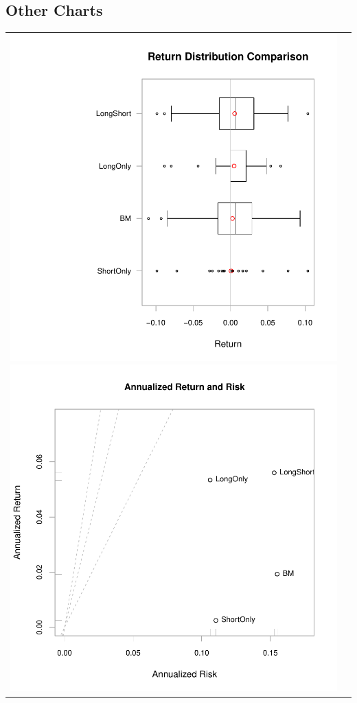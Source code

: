 \documentclass{article}
\begin{document}
\subsection{Other Charts}
\begin{tabular}{cc}
\includegraphics{graphics/plot-014}
\includegraphics{graphics/plot-015}
\end{tabular}
\end{document}
